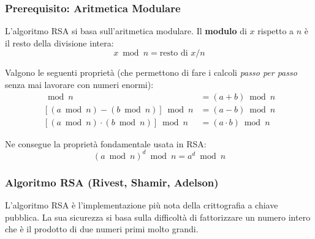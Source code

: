 
\subsubsection{Prerequisito: Aritmetica Modulare}
L'algoritmo RSA si basa sull'aritmetica modulare. Il \textbf{modulo} di $x$ rispetto a $n$ è il resto della divisione intera:
$$x \bmod n = \text{resto di } x / n$$

Valgono le seguenti proprietà (che permettono di fare i calcoli \textit{passo per passo} senza mai lavorare con numeri enormi):
\begin{align*}
    [(a \bmod n) + (b \bmod n)] \bmod n &= (a+b) \bmod n \\
    [(a \bmod n) - (b \bmod n)] \bmod n &= (a-b) \bmod n \\
    [(a \bmod n) \cdot (b \bmod n)] \bmod n &= (a \cdot b) \bmod n
\end{align*}

Ne consegue la proprietà fondamentale usata in RSA:
$$(a \bmod n)^d \bmod n = a^d \bmod n$$


\subsubsection{Algoritmo RSA (Rivest, Shamir, Adelson)}
L'algoritmo RSA è l'implementazione più nota della crittografia a chiave pubblica. La sua sicurezza si basa sulla difficoltà di fattorizzare un numero intero che è il prodotto di due numeri primi molto grandi.


